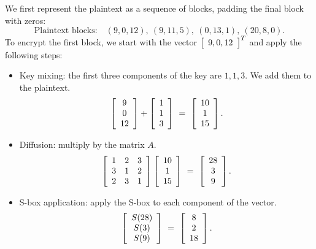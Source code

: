 \documentclass{ximera}
\begin{document}
\begin{solution}
  We first represent the plaintext as a sequence of blocks, padding
  the final block with zeros:
  \begin{equation*}
    \mbox{Plaintext blocks:}\quad
    (9,0,12),\
    (9,11,5),\
    (0,13,1),\
    (20,8,0).
  \end{equation*}
  To encrypt the first block, we start with the vector
  $\startmat{c}9,0,12\stopmat^T$ and apply the following steps:

  \noindent{\bf Round 1:}
  \begin{itemize}
  \item Key mixing: the first three components of the key are
    $1,1,3$. We add them to the plaintext.
    \begin{equation*}
      \startmat{c} 9 \\ 0 \\ 12 \stopmat
      +
      \startmat{c} 1 \\ 1 \\ 3 \stopmat
      ~=~
      \startmat{c} 10 \\ 1 \\ 15 \stopmat.
    \end{equation*}
  \item Diffusion: multiply by the matrix $A$.
    \begin{equation*}
      \startmat{ccc}
        1 & 2 & 3 \\
        3 & 1 & 2 \\
        2 & 3 & 1 \\
      \stopmat
      \startmat{c} 10 \\ 1 \\ 15 \stopmat
      ~=~
      \startmat{c} 28 \\ 3 \\ 9 \stopmat.
    \end{equation*}
  \item S-box application: apply the S-box to each component of the
    vector.
    \begin{equation*}
      \startmat{c} S(28) \\ S(3) \\ S(9) \stopmat
      ~=~
      \startmat{c} 8 \\ 2 \\ 18 \stopmat.
    \end{equation*}
  \end{itemize}


\end{solution}
\end{document}
